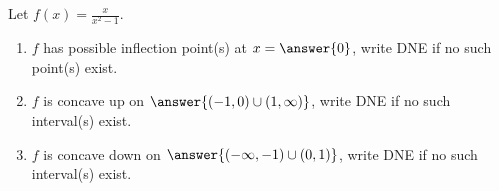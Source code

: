 \documentclass{ximera}
\author{Gregory Hartman \and Matthew Carr}
\begin{document}
\begin{exercise}






Let $f(x)=\frac{x}{x^2-1}$.
\begin{enumerate}
\item		$f$ has possible inflection point(s) at $x=\answer{0}$, write DNE if no such point(s) exist.
\item		$f$ is concave up on $\answer{(-1,0)\cup(1,\infty)}$, write DNE if no such interval(s) exist.
\item		$f$ is concave down on $\answer{(-\infty,-1)\cup(0,1)}$, write DNE if no such interval(s) exist.
\end{enumerate}

\end{exercise}
\end{document}
